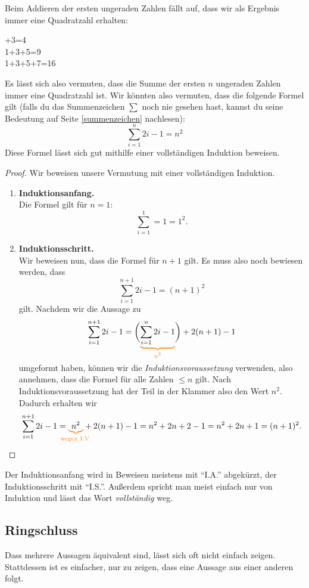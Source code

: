 \documentclass[../../main.tex]{subfiles}
\begin{document}
    \begin{advexample}{}
        Beim Addieren der ersten ungeraden Zahlen fällt auf, dass wir als Ergebnis immer eine Quadratzahl erhalten:
        \begin{multicols}{3}+3=4\\
            1+3+5=9\\
            1+3+5+7=16
        \end{multicols}
        Es lässt sich also vermuten, dass die Summe der ersten $n$ ungeraden Zahlen immer eine Quadratzahl ist. Wir könnten also vermuten, dass die folgende Formel gilt (falls du das Summenzeichen $\sum$ noch nie gesehen hast, kannst du seine Bedeutung auf Seite \ref{summenzeichen} nachlesen):
        \[\sum_{i=1}^n2i-1=n^2\]
        Diese Formel lässt sich gut mithilfe einer vollständigen Induktion beweisen.
        \begin{proof}
        Wir beweisen unsere Vermutung mit einer vollständigen Induktion.
        \begin{enumerate}
            \item \textbf{Induktionsanfang.}\\
                Die Formel gilt für $n=1$:
                \[\sum_{i=1}^1=1=1^2.\]
            \item \textbf{Induktionsschritt.}\\
                Wir beweisen nun, dass die Formel für $n+1$ gilt. Es muss also noch bewiesen werden, dass
                \[\sum_{i=1}^{n+1}2i-1=(n+1)^2\]
                gilt. Nachdem wir die Aussage zu
                \[\sum_{i=1}^{n+1}2i-1=\biggl(\colorbrace{\sum_{i=1}^n2i-1}{n^2}\biggr)+2(n+1)-1\]
                umgeformt haben, können wir die \emph{Induktionsvoraussetzung} verwenden, also annehmen, dass die Formel für alle Zahlen $\leq n$ gilt. Nach Induktionsvoraussetzung hat der Teil in der Klammer also den Wert $n^2$. Dadurch erhalten wir
                \[\sum_{i=1}^{n+1}2i-1=\colorbrace{n^2}{\text{wegen~I.V.}}+2(n+1)-1=n^2+2n+2-1=n^2+2n+1=(n+1)^2.\]
        \end{enumerate}
        \end{proof}
    \end{advexample}
    Der Induktionsanfang wird in Beweisen meistens mit \enquote{I.A.} abgekürzt, der Induktionsschritt mit \enquote{I.S.}. Außerdem spricht man meist einfach nur von Induktion und lässt das Wort \emph{vollständig} weg.
    
    \subsection*{Ringschluss}
    Dass mehrere Aussagen äquivalent sind, lässt sich oft nicht einfach zeigen. Stattdessen ist es einfacher, nur zu zeigen, dass eine Aussage aus einer anderen folgt.
\end{document}

